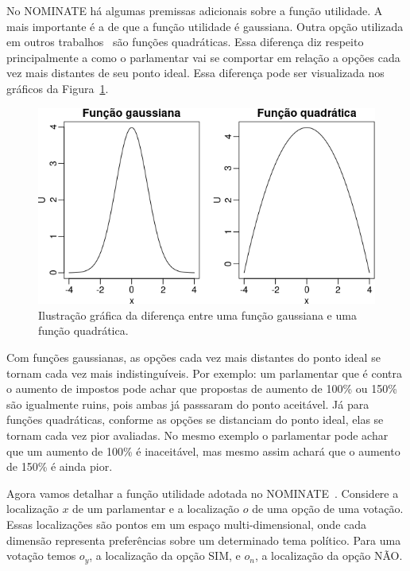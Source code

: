 \documentclass[
	article,			%
	12pt,				%
    twoside,			%
	a4paper,			%
	english,			%
	french,				%
	spanish,			%
	brazil,				%
	]{abntex2}
\newcommand\nay{NÃO\xspace}
\newcommand\yea{SIM\xspace}
\newcommand\nominate{NOMINATE\xspace}
\begin{document}
No \nominate há algumas premissas adicionais sobre a função utilidade. A mais importante é a de que a função utilidade é gaussiana. Outra opção utilizada em outros trabalhos~\cite{clinton2004ideal} são funções quadráticas. Essa diferença diz respeito principalmente a como o parlamentar vai se comportar em relação a opções cada vez mais distantes de seu ponto ideal. Essa diferença pode ser visualizada nos gráficos da Figura~\ref{fig:gaussiana_quadratica}. 

\begin{figure}[h!]
  \centering
  \includegraphics[scale=0.6]{figs/gaussiana_quadratica.png}
  \caption{Ilustração gráfica da diferença entre uma função gaussiana e uma função quadrática.}
  \label{fig:gaussiana_quadratica}
\end{figure}

Com funções gaussianas, as opções cada vez mais distantes do ponto ideal se tornam cada vez mais indistinguíveis. Por exemplo: um parlamentar que é contra o aumento de impostos pode achar que propostas de aumento de 100\% ou 150\% são igualmente ruins, pois ambas já passsaram do ponto aceitável. Já para funções quadráticas, conforme as opções se distanciam do ponto ideal, elas se tornam cada vez pior avaliadas. No mesmo exemplo o parlamentar pode achar que um aumento de 100\% é inaceitável, mas mesmo assim achará que o aumento de 150\% é ainda pior.

Agora vamos detalhar a função utilidade adotada no \nominate~\cite{poole1985nominate}. Considere a localização $x$ de um parlamentar e a localização $o$ de uma opção de uma votação. Essas localizações são pontos em um espaço multi-dimensional, onde cada dimensão representa preferências sobre um determinado tema político. Para uma votação temos $o_y$, a localização da opção \yea, e $o_n$, a localização da opção \nay. 
\end{document}
